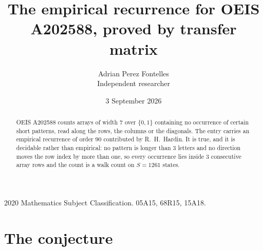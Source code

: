 \documentclass[11pt,a4paper]{article}
\title{The empirical recurrence for OEIS A202588, proved by transfer matrix}
\author{Adrian Perez Fontelles\\ \small Independent researcher}
\date{3 September 2026}
\theoremstyle{plain}
\theoremstyle{definition}
\begin{document}
\maketitle

\begin{abstract}
OEIS A202588 counts arrays of width $7$ over $\{0,1\}$ containing no occurrence of certain short
patterns, read along the rows, the columns or the diagonals. The entry carries an empirical
recurrence of order $90$ contributed by R.~H.~Hardin. It is true, and it is decidable
rather than empirical: no pattern is longer than $3$ letters and no direction moves the row
index by more than one, so every occurrence lies inside $3$ consecutive array rows and the
count is a walk count on $S=1261$ states.
\end{abstract}

\noindent\small 2020 Mathematics Subject Classification. 05A15, 68R15, 15A18.\normalsize

\section{The conjecture}
\end{document}
